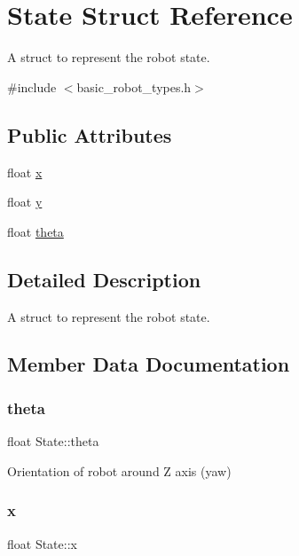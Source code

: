 \hypertarget{structState}{}\section{State Struct Reference}
\label{structState}


A struct to represent the robot state.  




{\ttfamily \#include $<$basic\+\_\+robot\+\_\+types.\+h$>$}

\subsection*{Public Attributes}
\begin{DoxyCompactItemize}
\item 
float \hyperlink{structState_a9948cc668f49246582cfd131b7928f7e}{x}
\item 
float \hyperlink{structState_a89572abb38dea3b1a780ede589a2d59b}{y}
\item 
float \hyperlink{structState_a30afc89f484d7de62a17809c2a70a410}{theta}
\end{DoxyCompactItemize}


\subsection{Detailed Description}
A struct to represent the robot state. 

\subsection{Member Data Documentation}
\mbox{\label{structState_a30afc89f484d7de62a17809c2a70a410}} 
\subsubsection{\texorpdfstring{theta}{theta}}
{\footnotesize\ttfamily float State\+::theta}

Orientation of robot around Z axis (yaw) \mbox{\label{structState_a9948cc668f49246582cfd131b7928f7e}} 
\subsubsection{\texorpdfstring{x}{x}}
{\footnotesize\ttfamily float State\+::x}

